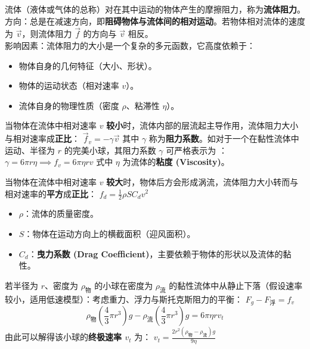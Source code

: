 \documentclass[lang=cn,11pt]{elegantbook}
\begin{document}
\begin{definition}[流体阻力]
 流体（液体或气体的总称）对在其中运动的物体产生的摩擦阻力，称为\textbf{流体阻力}。\\
 方向：总是在减速方向，即\textbf{阻碍物体与流体间的相对运动}。若物体相对流体的速度为 $\vec{v}$，则流体阻力 $\vec{f}$ 的方向与 $\vec{v}$ 相反。\\
 影响因素：流体阻力的大小是一个复杂的多元函数，它高度依赖于：
 \begin{itemize}
 \item 物体自身的几何特征（大小、形状）。
 \item 物体的运动状态（相对速率 $v$）。
 \item 流体自身的物理性质（密度 $\rho$、粘滞性 $\eta$）。
 \end{itemize}
\end{definition}

当物体在流体中相对速率 $v$ \textbf{较小}时，流体内部的层流起主导作用，流体阻力大小与相对速率成\textbf{正比}： \(\vec{f}_v = -\gamma \vec{v}\) 其中 $\gamma$ 称为\textbf{阻力系数}。如对于一个在黏性流体中运动、半径为 $r$ 的完美小球，其阻力系数 $\gamma$ 可严格表示为
： \(\gamma = 6\pi r \eta \implies f_v = 6\pi \eta r v\) 
式中 $\eta$ 为流体的\textbf{粘度 (Viscosity)}。

当物体在流体中相对速率 $v$ \textbf{较大}时，物体后方会形成涡流，流体阻力大小转而与相对速率的\textbf{平方}成\textbf{正比}：
 \(f_d = \frac{1}{2} \rho S C_d v^2\) 
\begin{itemize}
 \item $\rho$：流体的质量密度。
 \item $S$：物体在运动方向上的横截面积（迎风面积）。
 \item $C_d$：\textbf{曳力系数 (Drag Coefficient)}，主要依赖于物体的形状以及流体的黏性。
\end{itemize}
若半径为 $r$、密度为 $\rho_{\text{物}}$ 的小球在密度为 $\rho_{\text{流}}$ 的黏性流体中从静止下落（假设速率较小，适用低速模型）：考虑重力、浮力与斯托克斯阻力的平衡：
 \(F_g - F_{\text{浮}} = f_v\) 
\[
\rho_{\text{物}} \left(\frac{4}{3}\pi r^3\right)g - \rho_{\text{流}} \left(\frac{4}{3}\pi r^3\right)g = 6\pi \eta r v_t
\]
由此可以解得该小球的\textbf{终极速率 $v_t$} 为：
 \(v_t = \frac{2r^2(\rho_{\text{物}} - \rho_{\text{流}})g}{9\eta}\) 
\end{document}
